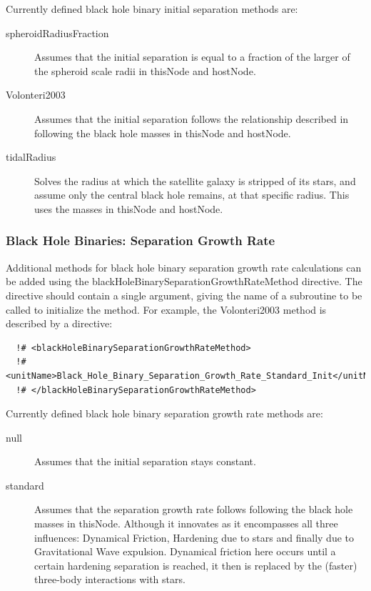 Currently defined black hole binary initial separation methods are:
\begin{description}
 \item [{\normalfont \ttfamily spheroidRadiusFraction}] Assumes that the initial separation is equal to a fraction {\normalfont \ttfamily [blackHoleInitialRadiusSpheroidRadiusRatio]} of the larger of the spheroid scale radii in {\normalfont \ttfamily thisNode} and {\normalfont \ttfamily hostNode}.
 \item [{\normalfont \ttfamily Volonteri2003}] Assumes that the initial separation follows the relationship described in \cite{volonteri_assembly_2003} following the black hole masses in {\normalfont \ttfamily thisNode} and {\normalfont \ttfamily hostNode}.
\item [{\normalfont \ttfamily tidalRadius}] Solves the radius at which the satellite galaxy is stripped of its stars, and assume only the central black hole remains, at that specific radius. This uses the masses in {\normalfont \ttfamily thisNode} and {\normalfont \ttfamily hostNode}.
\end{description}

\subsubsection{Black Hole Binaries: Separation Growth Rate}\label{sec:SMBHRadialMotion}

Additional methods for black hole binary separation growth rate calculations can be added using the {\normalfont \ttfamily blackHoleBinarySeparationGrowthRateMethod} directive. The directive should contain a single argument, giving the name of a subroutine to be called to initialize the method. For example, the {\normalfont \ttfamily Volonteri2003} method is described by a directive:

\begin{verbatim}
  !# <blackHoleBinarySeparationGrowthRateMethod>
  !#  <unitName>Black_Hole_Binary_Separation_Growth_Rate_Standard_Init</unitName>
  !# </blackHoleBinarySeparationGrowthRateMethod>
\end{verbatim}

Currently defined black hole binary separation growth rate methods are:
\begin{description}
 \item [{\normalfont \ttfamily null}] Assumes that the initial separation stays constant.
 \item [{\normalfont \ttfamily standard}] Assumes that the separation growth rate follows \cite{volonteri_assembly_2003} following the black hole masses in {\normalfont \ttfamily thisNode}. Although it innovates as it encompasses all three influences: Dynamical Friction, Hardening due to stars and finally due to Gravitational Wave expulsion. Dynamical friction here occurs until a certain hardening separation is reached, it then is replaced by the (faster) three-body interactions with stars.
\end{description}

